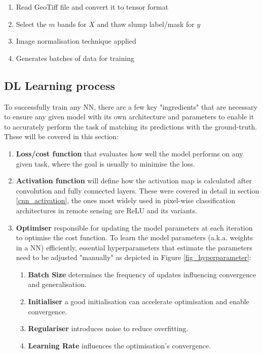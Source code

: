 \begin{enumerate}
    \item Read GeoTiff file and convert it to tensor format
    \item Select the $m$ bands for $X$ and thaw slump label/mask for $y$
    \item Image normalisation technique applied
    \item Generates batches of data for training
\end{enumerate}

\subsection{\gls{DL} Learning process} \label{nn_hyperparameters}
To successfully train any \gls{NN}, there are a few key "ingredients" that are necessary to ensure any given model with its own architecture and parameters to enable it to accurately perform the task of matching its predictions with the ground-truth. These will be covered in this section:
 

\begin{enumerate}
    \item \textbf{Loss/cost function} that evaluates how well the model performs on any given task, where the goal is usually to minimise the loss.
    \item \textbf{Activation function} will define how the activation map is calculated after convolution and fully connected layers. These were covered in detail in section \ref{cnn_activation}, the ones most widely used in pixel-wise classification architectures in remote sensing are \gls{ReLU} and its variants.
    \item \textbf{Optimiser} responsible for updating the model parameters at each iteration to optimise the cost function. To learn the model parameters (\gls{a.k.a.} weights in a \gls{NN}) efficiently, essential hyperparameters that estimate the parameters need to be adjusted "manually" as depicted in Figure \ref{fig_hyperparameter}:
        \begin{enumerate}
            \item \textbf{Batch Size} determines the frequency of updates influencing convergence and generalisation.
            \item \textbf{Initialiser} a good initialisation can accelerate optimisation and enable convergence.
            \item \textbf{Regulariser} introduces noise to reduce overfitting.
            \item \textbf{Learning Rate} influences the optimisation’s convergence.
        \end{enumerate}
        
\end{enumerate}

